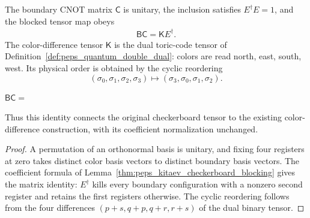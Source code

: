 \begin{lemma}%
    \label{thm:peps_kitaev_checkerboard_map_identity}
    \leanok
    The boundary CNOT matrix $\mathsf C$ is unitary, the inclusion satisfies
    $E^\dagger E=1$, and the blocked tensor map obeys
    \begin{align}
        \mathsf B\mathsf C=\mathsf K E^\dagger.
    \end{align}
    The color-difference tensor $\mathsf K$ is the dual toric-code tensor of
    Definition~\ref{def:peps_quantum_double_dual}: colors are read north,
    east, south, west. Its physical order is obtained by the cyclic reordering
    \[
        (\sigma_0,\sigma_1,\sigma_2,\sigma_3)
        \longmapsto(\sigma_3,\sigma_0,\sigma_1,\sigma_2).
    \]
    \begin{tenkzequation}
        $\mathsf B\mathsf C =$
        \tenkzkernel
        \begin{tenkz}[rows={wire,wire,wire},cols=3,bonds=none]
        \end{tenkz}
    \end{tenkzequation}
    Thus this identity connects the original checkerboard tensor to the
    existing color-difference construction, with its coefficient normalization
    unchanged.
\end{lemma}

\begin{proof}\leanok
    A permutation of an orthonormal basis is unitary, and fixing four
    registers at zero takes distinct color basis vectors to distinct boundary
    basis vectors. The coefficient formula of
    Lemma~\ref{thm:peps_kitaev_checkerboard_blocking} gives the matrix
    identity: $E^\dagger$ kills every boundary configuration with a nonzero
    second register and retains the first registers otherwise. The cyclic
    reordering follows from the four differences
    $(p+s,q+p,q+r,r+s)$ of the dual binary tensor.
\end{proof}
